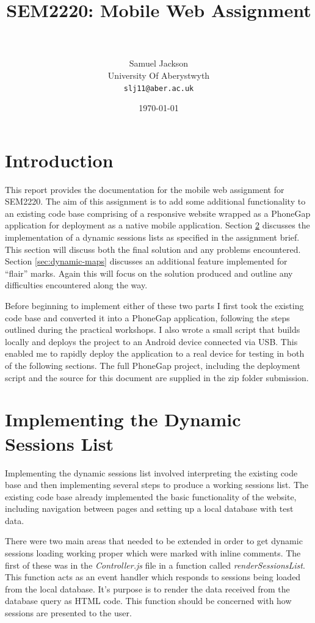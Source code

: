 \documentclass[paper=a4, fontsize=11pt]{scrartcl}	%
\title{
	\vspace{-0.5in} 	\usefont{OT1}{bch}{b}{n}
        SEM2220: Mobile Web Assignment \
}
\author{
	\usefont{OT1}{bch}{m}{n} Samuel Jackson
	\\ \usefont{OT1}{bch}{m}{n} University Of Aberystwyth
	\\   \texttt{slj11@aber.ac.uk}
}
\date{\today}
\numberwithin{equation}{section}															%
\numberwithin{figure}{section}																%
\numberwithin{table}{section}
\begin{document}
\maketitle

\clearpage

\section{Introduction}
\label{sec:introduction}
This report provides the documentation for the mobile web assignment for SEM2220. The aim of this assignment is to add some additional functionality to an existing code base comprising of a responsive website wrapped as a PhoneGap application for deployment as a native mobile application. Section \ref{sec:dynamic-lists} discusses the implementation of a dynamic sessions lists as specified in the assignment brief. This section will discuss both the final solution and any problems encountered. Section \ref{sec:dynamic-maps} discusses an additional feature implemented for ``flair'' marks. Again this will focus on the solution produced and outline any difficulties encountered along the way.

Before beginning to implement either of these two parts I first took the existing code base and converted it into a PhoneGap application, following the steps outlined during the practical workshops. I also wrote a small script that builds locally and deploys the project to an Android device connected via USB. This enabled me to rapidly deploy the application to a real device for testing in both of the following sections. The full PhoneGap project, including the deployment script and the source for this document are supplied in the zip folder submission.

\section{Implementing the Dynamic Sessions List}
\label{sec:dynamic-lists}
Implementing the dynamic sessions list involved interpreting the existing code base and then implementing several steps to produce a working sessions list. The existing code base already implemented the basic functionality of the website, including navigation between pages and setting up a local database with test data. 

There were two main areas that needed to be extended in order to get dynamic sessions loading working proper which were marked with inline comments. The first of these was in the \textit{Controller.js} file in a function called \textit{renderSessionsList}. This function acts as an event handler which responds to sessions being loaded from the local database. It's purpose is to render the data received from the database query as HTML code. This function should be concerned with how sessions are presented to the user.
\end{document}
